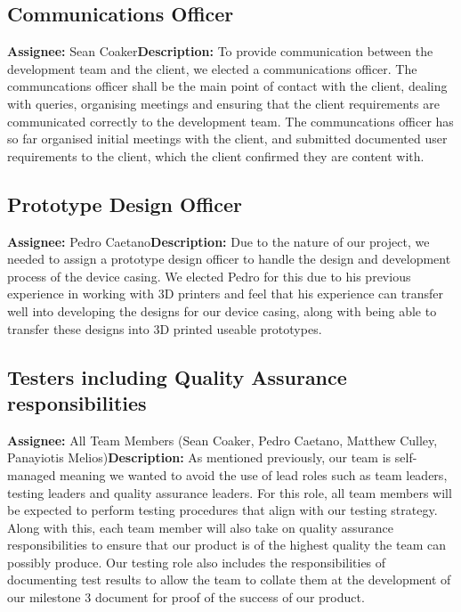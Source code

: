         \subsection{Communications Officer} \textbf{Assignee: } Sean Coaker\newline \textbf{Description: } To provide
        communication between the development team and the client, we elected a communications officer. The
        communcations officer shall be the main point of contact with the client, dealing with queries, organising
        meetings and ensuring that the client requirements are communicated correctly to the development team. The
        communcations officer has so far organised initial meetings with the client, and submitted documented user
        requirements to the client, which the client confirmed they are content with.

        \subsection{Prototype Design Officer} \textbf{Assignee: } Pedro Caetano\newline \textbf{Description: } Due to
        the nature of our project, we needed to assign a prototype design officer to handle the design and development
        process of the device casing. We elected Pedro for this due to his previous experience in working with 3D
        printers and feel that his experience can transfer well into developing the designs for our device casing, along
        with being able to transfer these designs into 3D printed useable prototypes.

        \subsection{Testers including Quality Assurance responsibilities} \textbf{Assignee: } All Team Members (Sean
        Coaker, Pedro Caetano, Matthew Culley, Panayiotis Melios)\newline \textbf{Description: } As mentioned
        previously, our team is self-managed meaning we wanted to avoid the use of lead roles such as team leaders,
        testing leaders and quality assurance leaders. For this role, all team members will be expected to perform
        testing procedures that align with our testing strategy. Along with this, each team member will also take on
        quality assurance responsibilities to ensure that our product is of the highest quality the team can possibly
        produce. Our testing role also includes the responsibilities of documenting test results to allow the team to
        collate them at the development of our milestone 3 document for proof of the success of our product.

